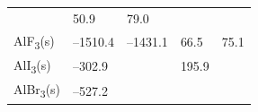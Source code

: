 \documentclass[
  9pt,
]{extbook}
\theoremstyle{definition}
\theoremstyle{definition}
\theoremstyle{definition}
\theoremstyle{remark}
\begin{document}
\begin{longtable}[]{@{}lllll@{}}
\begin{minipage}[t]{0.20\columnwidth}
\end{minipage} & \begin{minipage}[t]{0.18\columnwidth}\raggedright
50.9\strut
\end{minipage} & \begin{minipage}[t]{0.18\columnwidth}\raggedright
79.0\strut
\end{minipage}\tabularnewline
\begin{minipage}[t]{0.10\columnwidth}\raggedright
AlF\textsubscript{3}(s)\strut
\end{minipage} & \begin{minipage}[t]{0.19\columnwidth}\raggedright
--1510.4\strut
\end{minipage} & \begin{minipage}[t]{0.20\columnwidth}\raggedright
--1431.1\strut
\end{minipage} & \begin{minipage}[t]{0.18\columnwidth}\raggedright
66.5\strut
\end{minipage} & \begin{minipage}[t]{0.18\columnwidth}\raggedright
75.1\strut
\end{minipage}\tabularnewline
\begin{minipage}[t]{0.10\columnwidth}\raggedright
AlI\textsubscript{3}(s)\strut
\end{minipage} & \begin{minipage}[t]{0.19\columnwidth}\raggedright
--302.9\strut
\end{minipage} & \begin{minipage}[t]{0.20\columnwidth}\raggedright
\strut
\end{minipage} & \begin{minipage}[t]{0.18\columnwidth}\raggedright
195.9\strut
\end{minipage} & \begin{minipage}[t]{0.18\columnwidth}\raggedright
\strut
\end{minipage}\tabularnewline
\begin{minipage}[t]{0.10\columnwidth}\raggedright
AlBr\textsubscript{3}(s)\strut
\end{minipage} & \begin{minipage}[t]{0.19\columnwidth}\raggedright
--527.2\strut
\end{minipage} & \begin{minipage}[t]{0.20\columnwidth}\raggedright
\strut
\end{minipage} & \begin{minipage}[t]{0.18\columnwidth}\raggedright

\end{minipage}
\end{longtable}
\end{document}
